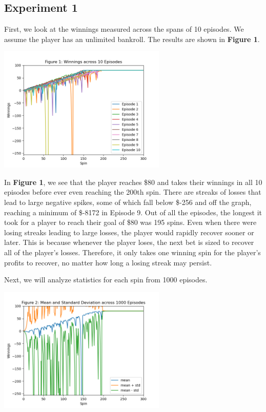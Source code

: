 \documentclass[
	letterpaper, %
]{jdf}
\begin{document}
\subsection{Experiment 1}
First, we look at the winnings measured across the spans of 10 episodes. We assume the player has an unlimited bankroll.
The results are shown in \textbf{Figure 1}.

\begin{jdffigure}
\includegraphics[height=6cm]{Figures/figure1.png}%
\label{fig:figure1}%
\end{jdffigure}

In \textbf{Figure 1}, we see that the player reaches \$80 and takes their winnings in all 10 episodes before ever even reaching the 200th spin.
There are streaks of losses that lead to large negative spikes, some of which fall below \$-256 and off the graph, reaching a minimum of \$-8172 in Episode 9. 
Out of all the episodes, the longest it took for a player to reach their goal of \$80 was 195 spins.
Even when there were losing streaks leading to large losses, the player would rapidly recover sooner or later.
This is because whenever the player loses, the next bet is sized to recover all of the player's losses.
Therefore, it only takes one winning spin for the player's profits to recover, no matter how long a losing streak may persist. 

Next, we will analyze statistics for each spin from 1000 episodes.

\begin{jdffigure}
\includegraphics[height=6cm]{Figures/figure2.png}%
\label{fig:figure2}%
\end{jdffigure}
	
\end{document}
